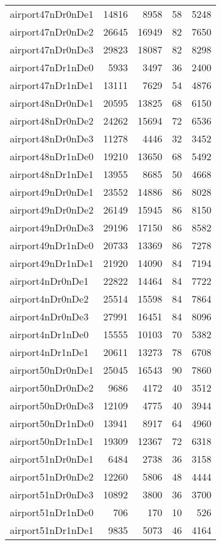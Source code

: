 \begin{longtable}{lrrrr}
airport47nDr0nDe1 & 14816 & 8958 & 58 & 5248 \\
airport47nDr0nDe2 & 26645 & 16949 & 82 & 7650 \\
airport47nDr0nDe3 & 29823 & 18087 & 82 & 8298 \\
airport47nDr1nDe0 & 5933 & 3497 & 36 & 2400 \\
airport47nDr1nDe1 & 13111 & 7629 & 54 & 4876 \\
airport48nDr0nDe1 & 20595 & 13825 & 68 & 6150 \\
airport48nDr0nDe2 & 24262 & 15694 & 72 & 6536 \\
airport48nDr0nDe3 & 11278 & 4446 & 32 & 3452 \\
airport48nDr1nDe0 & 19210 & 13650 & 68 & 5492 \\
airport48nDr1nDe1 & 13955 & 8685 & 50 & 4668 \\
airport49nDr0nDe1 & 23552 & 14886 & 86 & 8028 \\
airport49nDr0nDe2 & 26149 & 15945 & 86 & 8150 \\
airport49nDr0nDe3 & 29196 & 17150 & 86 & 8582 \\
airport49nDr1nDe0 & 20733 & 13369 & 86 & 7278 \\
airport49nDr1nDe1 & 21920 & 14090 & 84 & 7194 \\
airport4nDr0nDe1 & 22822 & 14464 & 84 & 7722 \\
airport4nDr0nDe2 & 25514 & 15598 & 84 & 7864 \\
airport4nDr0nDe3 & 27991 & 16451 & 84 & 8096 \\
airport4nDr1nDe0 & 15555 & 10103 & 70 & 5382 \\
airport4nDr1nDe1 & 20611 & 13273 & 78 & 6708 \\
airport50nDr0nDe1 & 25045 & 16543 & 90 & 7860 \\
airport50nDr0nDe2 & 9686 & 4172 & 40 & 3512 \\
airport50nDr0nDe3 & 12109 & 4775 & 40 & 3944 \\
airport50nDr1nDe0 & 13941 & 8917 & 64 & 4960 \\
airport50nDr1nDe1 & 19309 & 12367 & 72 & 6318 \\
airport51nDr0nDe1 & 6484 & 2738 & 36 & 3158 \\
airport51nDr0nDe2 & 12260 & 5806 & 48 & 4444 \\
airport51nDr0nDe3 & 10892 & 3800 & 36 & 3700 \\
airport51nDr1nDe0 & 706 & 170 & 10 & 526 \\
airport51nDr1nDe1 & 9835 & 5073 & 46 & 4164 \\

\end{longtable}
